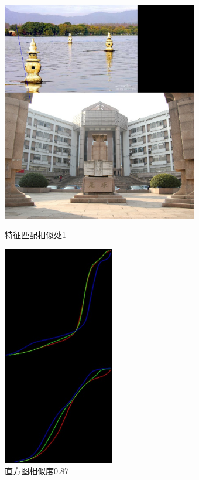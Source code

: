 \begin{figure}[htb]
\begin{minipage}[t]{0.5\linewidth}
\centering
\includegraphics[height=3.8in]{三映.jpg.d/im5sift.jpg}
\caption{特征匹配相似处1}
\label{fig:side:a}
\end{minipage}%
\begin{minipage}[t]{0.5\linewidth}
\centering
\includegraphics[height=3.8in]{三映.jpg.d/im5hist2.jpg}
\caption{直方图相似度0.87}
\label{fig:side:a}
\end{minipage}%
\end{figure}

\clearpage
